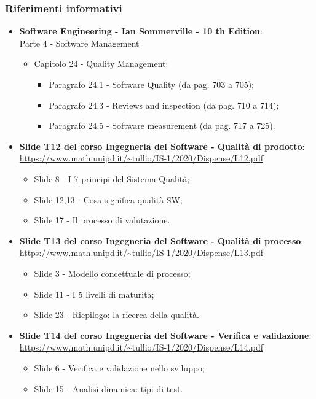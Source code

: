 \subsubsection{Riferimenti informativi}
\begin{itemize}
	\item \textbf{Software Engineering - Ian Sommerville - 10 th Edition}: \\
	Parte 4 - Software Management
	\begin{itemize}
	\item Capitolo 24 - Quality Management:
		\begin{itemize}
			\item Paragrafo 24.1 - Software Quality (da pag. 703 a 705);
			\item Paragrafo 24.3 - Reviews and inspection (da pag. 710 a 714);
			\item Paragrafo 24.5 - Software measurement (da pag. 717 a 725).
		\end{itemize}
	\end{itemize}
	
	\item \textbf{Slide T12 del corso Ingegneria del Software - Qualità di prodotto}:\\
	\textcolor{blue}{\url{https://www.math.unipd.it/~tullio/IS-1/2020/Dispense/L12.pdf}}
	\begin{itemize}
		\item Slide 8 - I 7 principi del Sistema Qualità;
		\item Slide 12,13 - Cosa significa qualità SW;
		\item Slide 17 - Il processo di valutazione.
	\end{itemize}
	
	\item \textbf{Slide T13 del corso Ingegneria del Software - Qualità di processo}:\\
	\textcolor{blue}{\url{https://www.math.unipd.it/~tullio/IS-1/2020/Dispense/L13.pdf}}
		\begin{itemize}
		\item Slide 3 - Modello concettuale di processo;
		\item Slide 11 - I 5 livelli di maturità;
		\item Slide 23 - Riepilogo: la ricerca della qualità.
	\end{itemize}
	
	\item \textbf{Slide T14 del corso Ingegneria del Software - Verifica e validazione}:\\
	\textcolor{blue}{\url{https://www.math.unipd.it/~tullio/IS-1/2020/Dispense/L14.pdf}}
	\begin{itemize}
		\item Slide 6 - Verifica e validazione nello sviluppo; 
		\item Slide 15 - Analisi dinamica: tipi di test.
	\end{itemize}
	

\end{itemize}
